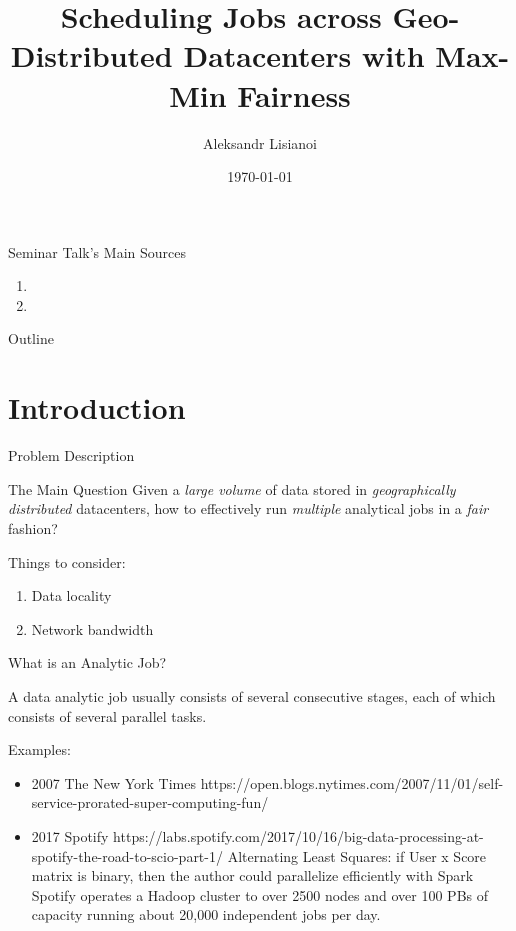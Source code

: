 \documentclass[presentation,professionalfonts]{beamer}
\institute[TU Wien]{Seminar ``\semname''\\\semester}
\date{\today}
\title[Scheduling Jobs with Max-Min Fairness]{Scheduling Jobs across Geo-Distributed Datacenters with Max-Min Fairness}
\author[Aleksandr Lisianoi]{Aleksandr Lisianoi}
\begin{document}
\maketitle

\begin{frame}{Seminar Talk's Main Sources}
  \begin{enumerate}
  \item {}
  \item {}
  \end{enumerate}
\end{frame}

\begin{frame}{Outline}
  \tableofcontents
\end{frame}

\section{Introduction}

\begin{frame}{Problem Description}
  \begin{block}{The Main Question}
    Given a \emph{large volume} of data stored in \emph{geographically distributed} datacenters, how to effectively run \emph{multiple} analytical jobs in a \emph{fair} fashion?
    \end{block}

  Things to consider:

  \begin{enumerate}
    \item Data locality
    \item Network bandwidth
  \end{enumerate}
\end{frame}

\begin{frame}{What is an Analytic Job?}

  A data analytic job usually consists of several consecutive stages, each of which consists of several parallel tasks.

  Examples:
  \begin{itemize}
  \item 2007 The New York Times https://open.blogs.nytimes.com/2007/11/01/self-service-prorated-super-computing-fun/
  \item 2017 Spotify https://labs.spotify.com/2017/10/16/big-data-processing-at-spotify-the-road-to-scio-part-1/
    Alternating Least Squares: if User x Score matrix is binary, then the author could parallelize efficiently with Spark
    Spotify operates a Hadoop cluster to over 2500 nodes and over 100 PBs of capacity running about 20,000 independent jobs per day.
    \end{itemize}

\end{frame}
\end{document}
